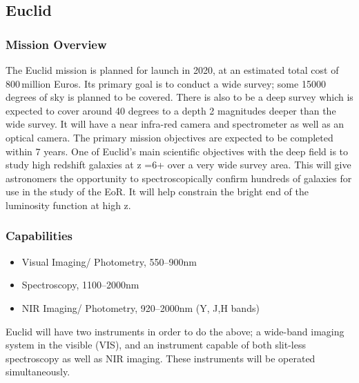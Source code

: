 
\subsection{Euclid} %
\label{sub:euclid}

	\subsubsection{Mission Overview} %
	\label{ssub:mission_overview}
		The Euclid mission is planned for launch in 2020, at an estimated total cost of 800\,million Euros\cite{bbc_euclid}. Its primary goal is to conduct a wide survey; some 15000 degrees of sky is planned to be covered. There is also to be a deep survey which is expected to cover around 40 degrees to a depth 2 magnitudes deeper than the wide survey. It will have a near infra-red camera and spectrometer as well as an optical camera. The primary mission  objectives are expected to be completed within 7 years. One of Euclid’s main scientific objectives with the deep field is to study high redshift galaxies at z =6+ over a very wide survey area. This will give astronomers the opportunity to spectroscopically confirm hundreds of galaxies for use in the study of the EoR. It will help constrain the bright end of the luminosity function at high z.

	\subsubsection{Capabilities} %
	\label{ssub:capabilities}
		\begin{itemize}
			\item Visual Imaging/ Photometry, 550--900\si{\nano\metre}
			\item Spectroscopy, 1100--2000\si{\nano\metre}
			\item NIR Imaging/ Photometry, 920--2000\si{\nano\metre} (Y, J,H bands)
		\end{itemize}

		Euclid will have two instruments in order to do the above; a wide-band imaging system in the visible (VIS), and an instrument capable of both slit-less spectroscopy as well as NIR imaging. These instruments will be operated simultaneously.

